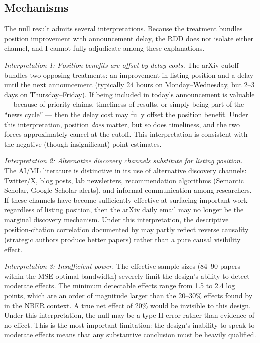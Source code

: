\documentclass[12pt]{article}
\begin{document}
\subsection{Mechanisms}

The null result admits several interpretations. Because the treatment bundles position improvement with announcement delay, the RDD does not isolate either channel, and I cannot fully adjudicate among these explanations.

\textit{Interpretation 1: Position benefits are offset by delay costs.} The arXiv cutoff bundles two opposing treatments: an improvement in listing position and a delay until the next announcement (typically 24 hours on Monday--Wednesday, but 2--3 days on Thursday--Friday). If being included in today's announcement is valuable --- because of priority claims, timeliness of results, or simply being part of the ``news cycle'' --- then the delay cost may fully offset the position benefit. Under this interpretation, position \textit{does} matter, but so does timeliness, and the two forces approximately cancel at the cutoff. This interpretation is consistent with the negative (though insignificant) point estimates.

\textit{Interpretation 2: Alternative discovery channels substitute for listing position.} The AI/ML literature is distinctive in its use of alternative discovery channels: Twitter/X, blog posts, lab newsletters, recommendation algorithms (Semantic Scholar, Google Scholar alerts), and informal communication among researchers. If these channels have become sufficiently effective at surfacing important work regardless of listing position, then the arXiv daily email may no longer be the marginal discovery mechanism. Under this interpretation, the descriptive position-citation correlation documented by \citet{haque2009, haque2010} may partly reflect reverse causality (strategic authors produce better papers) rather than a pure causal visibility effect.

\textit{Interpretation 3: Insufficient power.} The effective sample sizes (84--90 papers within the MSE-optimal bandwidth) severely limit the design's ability to detect moderate effects. The minimum detectable effects range from 1.5 to 2.4 log points, which are an order of magnitude larger than the 20--30\% effects found by \citet{feenberg2017} in the NBER context. A true net effect of 20\% would be invisible to this design. Under this interpretation, the null may be a type II error rather than evidence of no effect. This is the most important limitation: the design's inability to speak to moderate effects means that any substantive conclusion must be heavily qualified.
\end{document}
